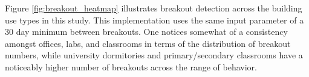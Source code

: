Figure \ref{fig:breakout_heatmap} illustrates breakout detection across the building use types in this study. This implementation uses the same input parameter of a 30 day minimum between breakouts. One notices somewhat of a consistency amongst offices, labs, and classrooms in terms of the distribution of breakout numbers, while university dormitories and primary/secondary classrooms have a noticeably higher number of breakouts across the range of behavior.